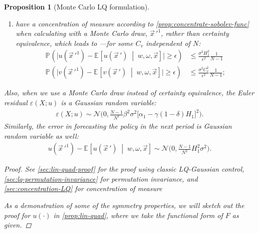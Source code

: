 \documentclass[12pt]{article}
\newtheorem{proposition}{Proposition}
\newcommand{\condexpec}[3][]{\ensuremath{\mathbb{E}_{#1}\left[{#2} \; \middle| \; {#3} \right]}}
\newcommand{\prob}[2][]{\ensuremath{\mathbb{P}_{#1}\left( {#2} \right)}}
\begin{document}
\begin{proposition}[Monte Carlo LQ formulation]
\begin{enumerate}
\item have a concentration of measure according to \cref{prop:concentrate-sobolev-func} when calculating with a Monte Carlo draw, $\vec{x}\,'^1$, rather than certainty equivalence, which leads to ---for some $C_v$ independent of $N$:
\begin{align}
\prob{\big|u(\vec{x}\,'^1)-\condexpec{u(\vec{x}\,')}{w, \omega,\vec{x}}\big|\geq \epsilon} &\leq \frac{\sigma^2 H_1^2}{\epsilon^2} \frac{1}{N-1}\label{inequ:concentration-measure-lin-policy}\\
\prob{\big|v(\vec{x}\,'^1)-\condexpec{v(\vec{x}\,')}{w,\omega, \vec{x}}\big|\geq \epsilon} &\leq \frac{\sigma^2 C_v^2}{\epsilon^2} \frac{1}{N-1}; \label{inequ:concentration-measure-quad-policy}
\end{align}
\end{enumerate}
\noindent Also, when we use a Monte Carlo draw instead of certainty equivalence, the Euler residual $\varepsilon(X;u)$ is a Gaussian random variable:
\begin{align}
\varepsilon(X;u) \sim \mathcal{N}\Big(0,\frac{N-1}{N^2} \beta^2\sigma^2\big[\alpha_1-\gamma(1-\delta)H_1\big]^2\Big).\label{eq:varepsilon-LQ}
\end{align}
Similarly, the error in forecasting the policy in the next period is Gaussian random variable as well:
\begin{align}
	u(\vec{x}\,'^1) - \condexpec{u(\vec{x}\,')}{w,\omega, \vec{x}} \sim \mathcal{N}\Big(0,\frac{N-1}{N^2} H_1^2 \sigma^2 \Big).\label{eq:ploicy-forcast-error-LQ}
\end{align} 
 
\begin{proof}
See \cref{sec:lin-quad-proof} for the proof using classic LQ-Gaussian control, \cref{sec:lq-permutation-invariance} for permutation invariance, and \cref{sec:concentration-LQ} for concentration of measure

As a demonstration of some of the symmetry properties, we will sketch out the proof for $u(\cdot)$ in \cref{prop:lin-quad}, where we take the functional form of $F$ as given.


\end{proof}
\end{proposition}
\end{document}
